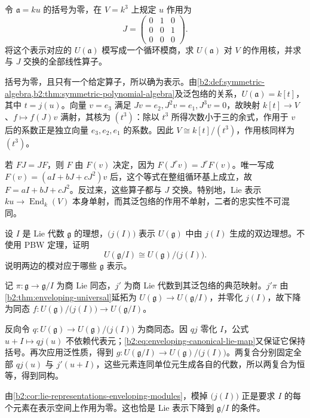 \begin{optionalexercise}\label{b2:ex:20-abelian-lie-jordan-modules}
	令 \(\mathfrak a=ku\) 的括号为零，在 \(V=k^3\) 上规定 \(u\) 作用为
	\[
		J=\begin{pmatrix}0&1&0\\0&0&1\\0&0&0\end{pmatrix}.
	\]
	将这个表示对应的 \(U(\mathfrak a)\) 模写成一个循环模商，求 \(U(\mathfrak a)\) 对 \(V\) 的作用核，并求与 \(J\) 交换的全部线性算子。
\end{optionalexercise}
\begin{solution}
	括号为零，且只有一个给定算子，所以确为表示。由\cref{b2:def:symmetric-algebra,b2:thm:symmetric-polynomial-algebra}及泛包络的关系，\(U(\mathfrak a)=k[t]\)，其中 \(t=j(u)\)。向量 \(v=e_3\) 满足 \(Jv=e_2,J^2v=e_1,J^3v=0\)，故映射 \(k[t]\to V\)、\(f\mapsto f(J)v\) 满射，其核为 \((t^3)\)：除以 \(t^3\) 所得次数小于三的余式，作用于 \(v\) 后的系数正是独立向量 \(e_3,e_2,e_1\) 的系数。因此 \(V\cong k[t]/(t^3)\)，作用核同样为 \((t^3)\)。

	若 \(FJ=JF\)，则 \(F\) 由 \(F(v)\) 决定，因为 \(F(J^rv)=J^rF(v)\)。唯一写成 \(F(v)=(aI+bJ+cJ^2)v\) 后，这个等式在整组循环基上成立，故 \(F=aI+bJ+cJ^2\)。反过来，这些算子都与 \(J\) 交换。特别地，Lie 表示 \(ku\to\operatorname{End}_k(V)\) 本身单射，而其泛包络的作用不单射，二者的忠实性不可混同。
\end{solution}

\begin{optionalexercise}\label{b2:ex:20-enveloping-ideal-quotient}
	设 \(I\) 是 Lie 代数 \(\mathfrak g\) 的理想，\(\bigl(j(I)\bigr)\) 表示 \(U(\mathfrak g)\) 中由 \(j(I)\) 生成的双边理想。不使用 PBW 定理，证明
	\[
		U(\mathfrak g/I)\cong U(\mathfrak g)/\bigl(j(I)\bigr).
	\]
	说明两边的模对应于哪些 \(\mathfrak g\) 表示。
\end{optionalexercise}
\begin{solution}
	记 \(\pi:\mathfrak g\to\mathfrak g/I\) 为商 Lie 同态，\(j'\) 为商 Lie 代数到其泛包络的典范映射。\(j'\pi\) 由\cref{b2:thm:enveloping-universal}延拓为 \(U(\mathfrak g)\to U(\mathfrak g/I)\)，并零化 \(j(I)\)，故下降为同态 \(f:U(\mathfrak g)/\bigl(j(I)\bigr)\to U(\mathfrak g/I)\)。

	反向令 \(q:U(\mathfrak g)\to U(\mathfrak g)/\bigl(j(I)\bigr)\) 为商同态。因 \(qj\) 零化 \(I\)，公式 \(u+I\mapsto qj(u)\) 不依赖代表元；\eqref{b2:eq:enveloping-canonical-lie-map}又保证它保持括号。再次应用泛性质，得到 \(g:U(\mathfrak g/I)\to U(\mathfrak g)/\bigl(j(I)\bigr)\)。两复合分别固定全部 \(qj(u)\) 与 \(j'(u+I)\)，这些元素连同单位元生成各自的代数，所以两复合为恒等，得到同构。

	由\cref{b2:cor:lie-representations-enveloping-modules}，模掉 \(\bigl(j(I)\bigr)\) 正是要求 \(I\) 的每个元素在表示空间上作用为零。这也恰是 Lie 表示下降到 \(\mathfrak g/I\) 的条件。
\end{solution}


